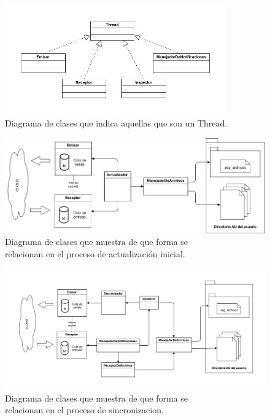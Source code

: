 \documentclass{article}
\begin{document}
\begin{figure}[h]
	\centering
	\includegraphics[width=0.85\textwidth]{images/Diagrama-modelo-cliente-threads.png}
	\caption{Diagrama de clases que indica aquellas que son un Thread.}
\end{figure}
\bigskip


\begin{figure}[h]
	\centering
	\includegraphics[width=1.0\textwidth]{images/Diagrama-modelo-cliente-actualizacion.png}
	\medskip
	\caption{Diagrama de clases que muestra de que forma se \\ relacionan en el proceso de actualización inicial.}
\end{figure}
\bigskip


\begin{figure}[h]
	\centering
	\includegraphics[width=1.0\textwidth]{images/Diagrama-modelo-cliente.png}
	\caption{Diagrama de clases que muestra de que forma se \\ relacionan en el proceso de sincronizacion.}
\end{figure}
\bigskip
\end{document}
